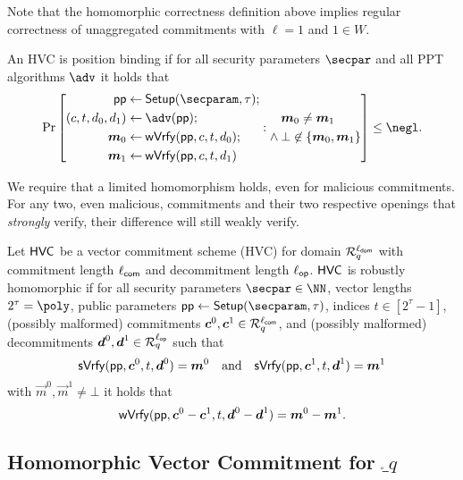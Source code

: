 \begin{remark}
  Note that the homomorphic correctness definition above implies regular correctness of unaggregated commitments with $\ell=1$ and $1\in W$.
\end{remark}
\begin{definition}
  An HVC is position binding if for all security parameters $\secpar$ and all PPT algorithms $\adv$ it holds that
  \[
    \Pr\left[
      \begin{aligned}
      \params\gets&\mspace{\medmuskip}\setup(\secparam,\tau);\\
      (c,t,d_0,d_1) \gets&\mspace{\medmuskip} \adv(\params);\\
      \vec{m}_0 \gets&\mspace{\medmuskip} \wverify(\params,c,t,d_0);\\
      \vec{m}_1 \gets&\mspace{\medmuskip} \wverify(\params,c,t,d_1)
      \end{aligned}:
      \begin{aligned}&\mspace{\medmuskip}\vec{m}_0\neq \vec{m}_1\\ \land&\mspace{\medmuskip}\bot\not\in\{\vec{m}_0,\vec{m}_1\}\end{aligned}
    \right]\leq \negl.
  \]
\end{definition}
We require that a limited homomorphism holds, even for malicious commitments.
For any two, even malicious, commitments and their two respective openings that \emph{strongly} verify, their difference will still weakly verify.

\begin{definition}
  \label{def:malhomhvc}
  Let $\mathsf{HVC}$ be a vector commitment scheme (HVC) for domain $\mathcal{R}^{\ell_{\mathsf{dom}}}_q$ with commitment length ${\ell_{\mathsf{com}}}$ and decommitment length ${\ell_{\mathsf{op}}}$.
  $\mathsf{HVC}$ is robustly homomorphic if for all security parameters $\secpar\in\NN$, vector lengths $2^\tau=\poly$, public parameters $\params\gets\setup(\secparam,\tau)$, indices $t\in[2^\tau-1]$, (possibly malformed) commitments $\boldsymbol{c}^0,\boldsymbol{c}^1 \in \mathcal{R}_q^{\ell_{\mathsf{com}}}$, and (possibly malformed) decommitments $\boldsymbol{d}^0,\boldsymbol{d}^1\in\mathcal{R}_q^{\ell_{\mathsf{op}}}$ such that
  \[
    \mathsf{sVrfy}(\mathsf{pp},\boldsymbol{c}^0, t,\boldsymbol{d}^0)=\boldsymbol{m}^0 \quad \text{and} \quad \mathsf{sVrfy}(\mathsf{pp},\boldsymbol{c}^1, t,\boldsymbol{d}^1)=\boldsymbol{m}^1
  \]
  with $\vec{m}^0,\vec{m}^1\neq \bot$ it holds that
  \[
    \mathsf{wVrfy}(\mathsf{pp},\boldsymbol{c}^0 - \boldsymbol{c}^1, t,\boldsymbol{d}^0 - \boldsymbol{d}^1)=\boldsymbol{m}^0 - \boldsymbol{m}^1.
  \]
\end{definition}


\subsection{Homomorphic Vector Commitment for $\ring_q$}

